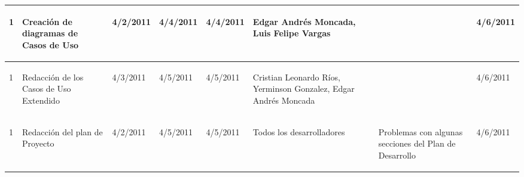 \begin{center}
\begin{longtable}{|p{}|p{}|p{}|p{}|p{}|p{}|p{}|p{}|}
{\begin{center}1\end{center}} & 
{\begin{center}Creación de diagramas de Casos de Uso\end{center}} & 
{\begin{center}4/2/2011\end{center}} & 
{\begin{center}4/4/2011\end{center}} & 
{\begin{center}4/4/2011\end{center}} & 
{\begin{center}Edgar Andrés Moncada, Luis Felipe Vargas\end{center}} & 
{} & 
{\begin{center}4/6/2011\end{center}}\\
\hline

{\begin{center}1\end{center}} & 
{\begin{center}Redacción de los Casos de Uso Extendido\end{center}} & 
{\begin{center} 4/3/2011 \end{center}} & 
{\begin{center} 4/5/2011 \end{center}} & 
{\begin{center} 4/5/2011 \end{center}} & 
{\begin{center} Cristian Leonardo Ríos, Yerminson Gonzalez, Edgar Andrés Moncada \end{center}} & 
{} & 
{\begin{center} 4/6/2011 \end{center}}\\
\hline
		
{\begin{center} 1 \end{center}} & 
{\begin{center} Redacción del plan de Proyecto \end{center}} & 
{\begin{center} 4/2/2011 \end{center}} & 
{\begin{center} 4/5/2011 \end{center}} & 
{\begin{center} 4/5/2011 \end{center}} & 
{\begin{center} Todos los desarrolladores \end{center}} & 
{\begin{center} Problemas con algunas secciones del Plan de Desarrollo \end{center}} & 
{\begin{center} 4/6/2011 \end{center}}\\
\hline


\end{longtable}
\end{center}

